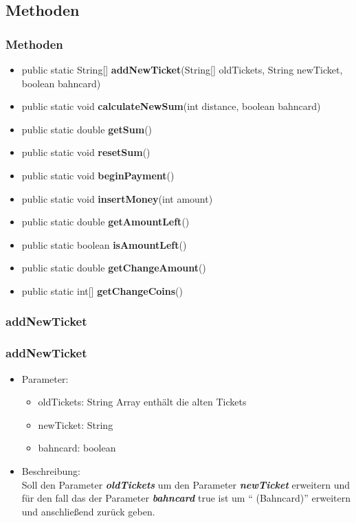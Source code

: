 \documentclass[final]{beamer}
\begin{document}
\subsection{Methoden}
\begin{frame}
	\frametitle{Methoden}
	\begin{itemize}
		\item{{\color{blue}public static} String[] \textbf{addNewTicket}(String[] oldTickets, String newTicket, {\color{blue}boolean} bahncard)}
		\item{{\color{blue}public static void} \textbf{calculateNewSum}({\color{blue}int} distance, {\color{blue}boolean} bahncard)}
		\item{{\color{blue}public static double} \textbf{getSum}()}
		\item{{\color{blue}public static void} \textbf{resetSum}()}
		\item{{\color{blue}public static void} \textbf{beginPayment}()}
		\item{{\color{blue}public static void} \textbf{insertMoney}({\color{blue}int} amount)}
		\item{{\color{blue}public static double} \textbf{getAmountLeft}()}
		\item{{\color{blue}public static boolean} \textbf{isAmountLeft}()}
		\item{{\color{blue}public static double} \textbf{getChangeAmount}()}
		\item{{\color{blue}public static int}[] \textbf{getChangeCoins}()}
	\end{itemize}
\end{frame}

\subsubsection{addNewTicket}
\begin{frame}
	\frametitle{addNewTicket}
	\begin{itemize}
		\item{Parameter:}
			\begin{itemize}
				\item{oldTickets: String Array enthält die alten Tickets}
				\item{newTicket: String}
				\item{bahncard: boolean}
			\end{itemize}
		\item{Beschreibung:}\\
Soll den Parameter \textbf{\textit{oldTickets}} um den Parameter \textbf{\textit{newTicket}} erweitern und für den fall das der Parameter \textbf{\textit{bahncard}} {\color{blue}true} ist um \enquote{ (Bahncard)} erweitern und anschließend zurück geben.
	\end{itemize}
\end{frame}
\end{document}
